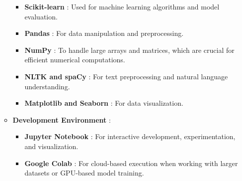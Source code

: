 \begin{itemize}
\begin{itemize}
\begin{itemize}
                    \item \textbf{Scikit-learn} :
                    \noindent
                    Used for machine learning algorithms and model evaluation.

                    \item \textbf{Pandas} :
                    \noindent
                    For data manipulation and preprocessing.

                    \item \textbf{NumPy} :
                    \noindent
                    To handle large arrays and matrices, which are crucial for efficient numerical computations.

                    \item \textbf{NLTK and spaCy} :
                    \noindent
                    For text preprocessing and natural language understanding.

                    \item \textbf{Matplotlib and Seaborn} :
                    \noindent
                    For data visualization.
                    
                \end{itemize}

            \item \textbf{Development Environment} :
            \noindent
                \begin{itemize}
                    
                    \item \textbf{Jupyter Notebook} :
                    \noindent
                    For interactive development, experimentation, and visualization.

                    \item \textbf{Google Colab} :
                    \noindent
                    For cloud-based execution when working with larger datasets or GPU-based model training.
                
                \end{itemize}
                
        \end{itemize}
    
\end{itemize}

